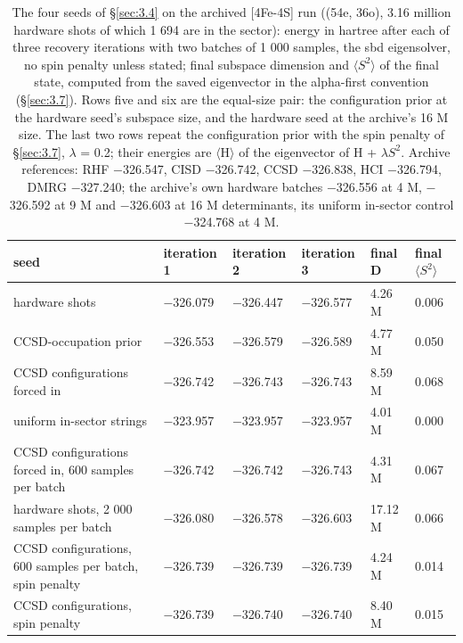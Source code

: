 \documentclass[11pt]{article}
\begin{document}
\begin{table}[htbp]
\centering
\caption{The four seeds of \S\ref{sec:3.4} on the archived [4Fe-4S] run \cite{IBMdata} ((54e, 36o), 3.16 million hardware shots of which 1 694 are in the sector): energy in hartree after each of three recovery iterations with two batches of 1 000 samples, the sbd eigensolver, no spin penalty unless stated; final subspace dimension and $\langle S^{2}\rangle$ of the final state, computed from the saved eigenvector in the alpha-first convention (\S\ref{sec:3.7}). Rows five and six are the equal-size pair: the configuration prior at the hardware seed's subspace size, and the hardware seed at the archive's 16 M size. The last two rows repeat the configuration prior with the spin penalty of \S\ref{sec:3.7}, $\lambda$ = 0.2; their energies are $\langle$H$\rangle$ of the eigenvector of H + $\lambda$$S^{2}$. Archive references: RHF $-$326.547, CISD $-$326.742, CCSD $-$326.838, HCI $-$326.794, DMRG $-$327.240; the archive's own hardware batches $-$326.556 at 4 M, $-$326.592 at 9 M and $-$326.603 at 16 M determinants, its uniform in-sector control $-$324.768 at 4 M.}\label{tab:9}
\footnotesize
\renewcommand{\arraystretch}{1.15}

\begin{tabularx}{\linewidth}{@{}>{\hsize=1.000\hsize\raggedright\arraybackslash}Xlllll@{}}
\toprule
seed & iteration 1 & iteration 2 & iteration 3 & final D & final $\langle S^{2}\rangle$ \\
\midrule
hardware shots & $-$326.079 & $-$326.447 & $-$326.577 & 4.26 M & 0.006 \\
CCSD-occupation prior & $-$326.553 & $-$326.579 & $-$326.589 & 4.77 M & 0.050 \\
CCSD configurations forced in & $-$326.742 & $-$326.743 & $-$326.743 & 8.59 M & 0.068 \\
uniform in-sector strings & $-$323.957 & $-$323.957 & $-$323.957 & 4.01 M & 0.000 \\
CCSD configurations forced in, 600 samples per batch & $-$326.742 & $-$326.742 & $-$326.743 & 4.31 M & 0.067 \\
hardware shots, 2 000 samples per batch & $-$326.080 & $-$326.578 & $-$326.603 & 17.12 M & 0.066 \\
CCSD configurations, 600 samples per batch, spin penalty & $-$326.739 & $-$326.739 & $-$326.739 & 4.24 M & 0.014 \\
CCSD configurations, spin penalty & $-$326.739 & $-$326.740 & $-$326.740 & 8.40 M & 0.015 \\
\bottomrule
\end{tabularx}
\end{table}
\end{document}
